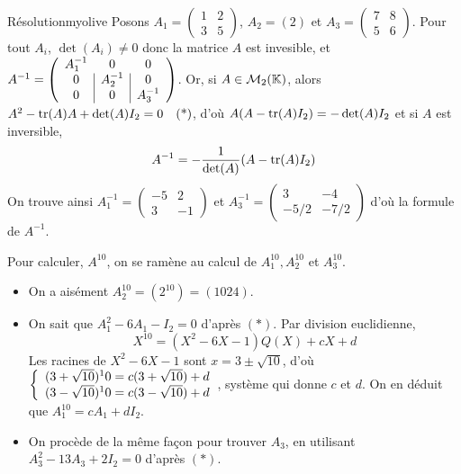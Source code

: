     \begin{demo}{Résolution}{myolive}
        Posons $A_1 = \begin{pmatrix}
            1 & 2 \\
            3 & 5
        \end{pmatrix}$, $A_2 = (2)$ et $A_3 = \begin{pmatrix}
            7 & 8 \\
            5 & 6
        \end{pmatrix}$. Pour tout $A_i$, $\det(A_i) \neq 0$ donc la matrice $A$ est invesible, et $A^{-1} = \left( \begin{array}{c | c | c}
            A_1^{-1} & 0 & 0 \\
            0 & A_2^{-1} & 0 \\
            0 & 0 & A_3^{-1}
        \end{array} \right)$. Or, si $A \in \mathcal{M}_{2}(\mathbb{K})$, alors $A^2 - \operatorname{tr}(A) A + \operatorname{det}(A) I_2 = 0 \quad (\text{*})$, d’où $A(A - \operatorname{tr}(A)I_2) = -\operatorname{det}(A) I_2$ et si $A$ est inversible, 
        \[ A^{-1} = -\frac{1}{\operatorname{det}(A)}(A - \operatorname{tr}(A) I_2) \]   
        On trouve ainsi $A_1^{-1} = \begin{pmatrix}
            -5 & 2 \\
            3 & -1
        \end{pmatrix}$ et $A_3^{-1} = \begin{pmatrix}
            3 & - 4 \\
            -5/2 & -7/2
        \end{pmatrix}$ d’où la formule de $A^{-1}$. 
    
        Pour calculer, $A^10$, on se ramène au calcul de $A_1^{10}, A_2^{10}$ et $A_3^{10}$. 
        \begin{itemize}
            \item On a aisément $A_2^{10} = (2^10) = (1024)$.
            \item On sait que $A_1^2 - 6 A_1 - I_2 = 0$ d’après $(*)$. Par division euclidienne, 
            \[ X^10 = (X^2 - 6X - 1) Q(X) + cX + d \]   
            Les racines de $X^2 - 6X - 1$ sont $x = 3 \pm \sqrt{10}$, d’où $\et{(3 + \sqrt{10})^10 = c(3 + \sqrt{10}) + d}{(3 - \sqrt{10})^10 = c(3 - \sqrt{10}) + d}$, système qui donne $c$ et $d$. On en déduit que $A_1^{10} = cA_1 + d I_2$.
            \item On procède de la même façon pour trouver $A_3$, en utilisant $A_3^2 - 13 A_3 + 2 I_2 = 0$ d’après $(*)$.
        \end{itemize}
    \end{demo}

